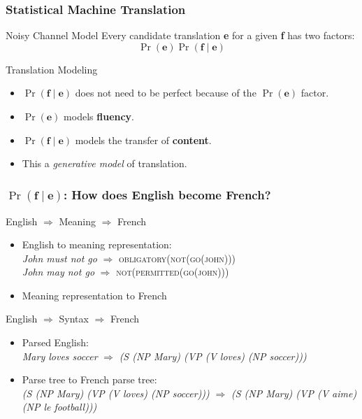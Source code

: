 \begin{frame}
\frametitle{Statistical Machine Translation}
\begin{block}{Noisy Channel Model}
Every candidate translation \textbf{e} for a given \textbf{f} has two factors:
\[ \Pr( \textbf{e} ) \Pr( \textbf{f} \mid \textbf{e} ) \]
\end{block}\pause
\begin{block}{Translation Modeling}
\begin{itemize}[<+->]
\item $\Pr( \textbf{f} \mid \textbf{e} )$ does not need to be perfect because of the $\Pr( \textbf{e} )$ factor.
\item $\Pr( \textbf{e} )$ models \textbf{fluency}.
\item $\Pr( \textbf{f} \mid \textbf{e} )$ models the transfer of \textbf{content}.
\item This a \textit{generative model} of translation.
\end{itemize}
\end{block}
\end{frame}

\begin{frame}
\frametitle{$\Pr( \textbf{f} \mid \textbf{e} )$: How does English become French?}
\begin{alertblock}{English $\Rightarrow$ Meaning $\Rightarrow$ French}
\begin{itemize}
\item English to meaning representation: \\
\textit{John must not go} $\Rightarrow$ \textsc{obligatory(not(go(john)))} \\
\textit{John may not go} $\Rightarrow$ \textsc{not(permitted(go(john)))}
\item Meaning representation to French
\end{itemize}
\end{alertblock}\pause
\begin{alertblock}{English $\Rightarrow$ Syntax $\Rightarrow$ French}
\begin{itemize}
\item Parsed English: \\
\textit{Mary loves soccer} $\Rightarrow$ \textit{(S (NP Mary) (VP (V loves) (NP soccer)))}
\item Parse tree to French parse tree: \\
\textit{(S (NP Mary) (VP (V loves) (NP soccer)))} $\Rightarrow$ \textit{(S (NP Mary) (VP (V aime) (NP le football)))}
\end{itemize}
\end{alertblock}
\end{frame}

